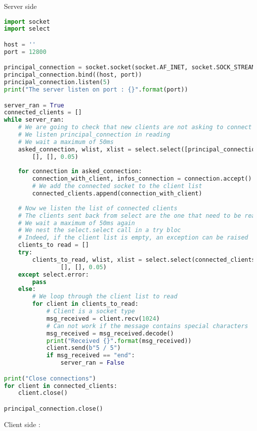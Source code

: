 \documentclass[a4paper, 12pt, titlepage]{scrartcl} %
\begin{document}
Server side
\begin{lstlisting}[language=Python]
import socket
import select

host = ''
port = 12800

principal_connection = socket.socket(socket.AF_INET, socket.SOCK_STREAM)
principal_connection.bind((host, port))
principal_connection.listen(5)
print("The server listen on port : {}".format(port))

server_ran = True
connected_clients = []
while server_ran:
    # We are going to check that new clients are not asking to connect
    # We listen principal_connection in reading
    # We wait a maximum of 50ms
    asked_connection, wlist, xlist = select.select([principal_connection],
        [], [], 0.05)
    
    for connection in asked_connection:
        connection_with_client, infos_connection = connection.accept()
        # We add the connected socket to the client list
        connected_clients.append(connection_with_client)
    
    # Now we listen the list of connected clients
    # The clients sent back from select are the one that need to be read (recv)
    # We wait a maximum of 50ms again
    # We nest the select.select call in a try bloc
    # Indeed, if the client list is empty, an exception can be raised
    clients_to read = []
    try:
        clients_to_read, wlist, xlist = select.select(connected_clients,
                [], [], 0.05)
    except select.error:
        pass
    else:
        # We loop through the client list to read
        for client in clients_to_read:
            # Client is a socket type
            msg_received = client.recv(1024)
            # Can not work if the message contains special characters
            msg_received = msg_received.decode()
            print("Received {}".format(msg_received))
            client.send(b"5 / 5")
            if msg_received == "end":
                server_ran = False

print("Close connections")
for client in connected_clients:
    client.close()

principal_connection.close()
\end{lstlisting} \vspace{5mm}
Client side :
\end{document}
